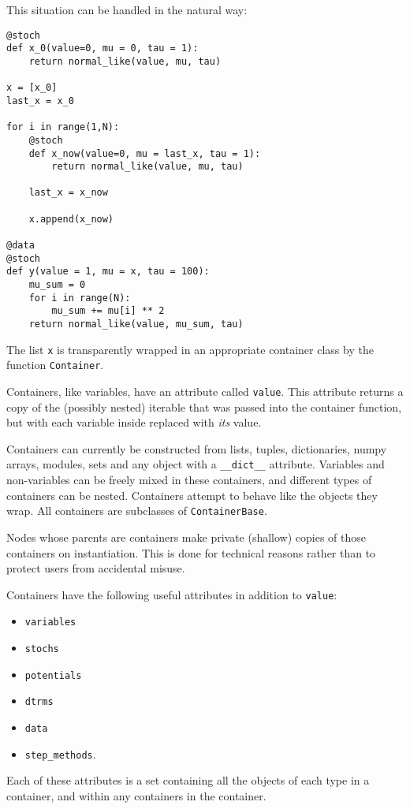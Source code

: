 This situation can be handled in the natural way:
\begin{verbatim}
@stoch
def x_0(value=0, mu = 0, tau = 1):
    return normal_like(value, mu, tau)

x = [x_0]
last_x = x_0

for i in range(1,N):          
    @stoch
    def x_now(value=0, mu = last_x, tau = 1):
        return normal_like(value, mu, tau)
        
    last_x = x_now
    
    x.append(x_now)

@data
@stoch
def y(value = 1, mu = x, tau = 100):
    mu_sum = 0
    for i in range(N):
        mu_sum += mu[i] ** 2
    return normal_like(value, mu_sum, tau)
\end{verbatim}
The list \texttt{x} is transparently wrapped in an appropriate container class by the function \texttt{Container}.

Containers, like variables, have an attribute called \texttt{value}. This attribute returns a copy of the (possibly nested) iterable that was passed into the container function, but with each variable inside replaced with \emph{its} value. 

Containers can currently be constructed from lists, tuples, dictionaries, numpy arrays, modules, sets and any object with a \texttt{__dict__} attribute. Variables and non-variables can be freely mixed in these containers, and different types of containers can be nested. Containers attempt to behave like the objects they wrap. All containers are subclasses of \texttt{ContainerBase}. 

Nodes whose parents are containers make private (shallow) copies of those containers on instantiation. This is done for technical reasons rather than to protect users from accidental misuse.

Containers have the following useful attributes in addition to \texttt{value}:
\begin{itemize}
    \item\texttt{variables}
    \item\texttt{stochs}
    \item\texttt{potentials}
    \item\texttt{dtrms}
    \item\texttt{data}
    \item\texttt{step_methods}.
\end{itemize}
Each of these attributes is a set containing all the objects of each type in a container, and within any containers in the container.

